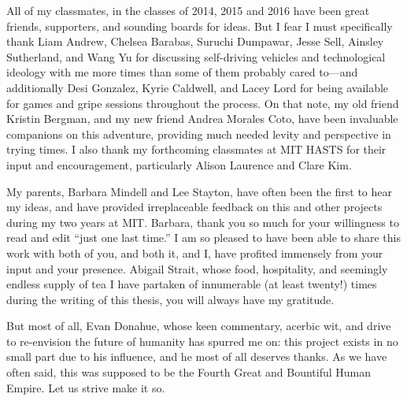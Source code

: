 All of my classmates, in the classes of 2014, 2015 and 2016 have been great
friends, supporters, and sounding boards for ideas. But I fear I must
specifically thank Liam Andrew, Chelsea Barabas, Suruchi Dumpawar,
Jesse Sell, Ainsley Sutherland, and Wang Yu for discussing
self-driving vehicles and technological ideology with me 
more times than some of them probably cared to---and additionally Desi
Gonzalez, Kyrie Caldwell, and Lacey Lord for being available for
games and gripe sessions throughout the process. On that note, my old
friend Kristin Bergman, and my new friend Andrea Morales Coto, have
been invaluable companions on this adventure, providing much needed
levity and perspective in trying times. I also thank my forthcoming
classmates at MIT HASTS for their input and encouragement,
particularly Alison Laurence and Clare Kim.

My parents, Barbara Mindell and Lee Stayton, have often been the first
to hear my ideas, and have provided irreplaceable feedback
on this and other projects during my two years at MIT. Barbara, thank
you so much for your willingness to read and edit ``just one last
time.'' I am so pleased 
to have been able to share this work with both of you, and both it, and I,
have profited immensely from your input and your presence. Abigail
Strait, whose food, hospitality, and seemingly endless supply of tea I have
partaken of innumerable (at least twenty!) times during the
writing of this thesis, you will always have my gratitude.

But most of all, Evan Donahue, whose keen commentary, acerbic wit, and
drive to re-envision the future of humanity has spurred me on: this
project exists in no small part due to his influence, and he most of
all deserves thanks. As we have 
often said, this was supposed to be the Fourth Great and Bountiful
Human Empire. Let us strive make it so.

 

